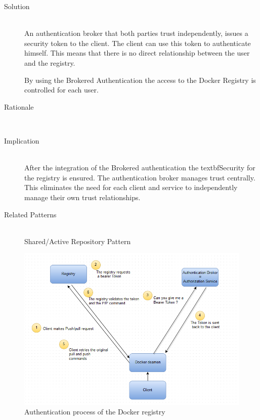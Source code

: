 \begin{description}
\item[Solution]~\\ 
An authentication broker that both parties trust independently, issues a security token to the client. The client can use this token to authenticate himself. This means that there is no direct relationship between the user and the registry.

By using the Brokered Authentication the access to the Docker Registry is controlled for each user.


\item[Rationale]~\\ 

\item[Implication]~\\ After the integration of the Brokered authentication the textbf{Security} for the registry is ensured. %
The authentication broker manages trust centrally. This eliminates the need for each client and service to independently manage their own trust relationships.

\item [Related Patterns]~\\
Shared/Active Repository Pattern

\end{description}

\begin{figure}[H]
\centering
\includegraphics[scale=0.7]{5-patterns/images/Authentication.png}
\caption{Authentication process of the Docker registry }
\label{fig:auth-process}
\end{figure}

